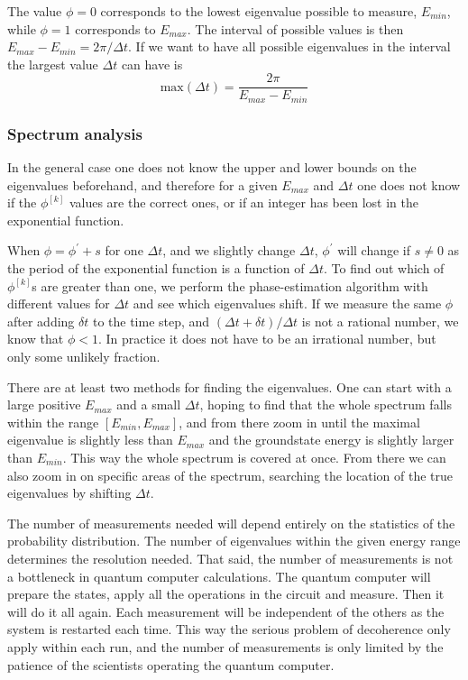 \documentclass[aps,pra,twocolumn,floatfix]{revtex4}
\begin{document}
The value $\phi=0$ corresponds to the lowest eigenvalue possible to measure,
$E_{min}$, while $\phi=1$ corresponds to $E_{max}$. The interval of
possible values is then $E_{max}-E_{min} = 2\pi/\Delta t$. If we want to
have all possible eigenvalues in the interval the largest value
$\Delta t$ can have is 
\begin{equation}
\mathrm{max}(\Delta t) = \frac{2\pi}{E_{max}-E_{min}}
\end{equation}



\subsubsection{Spectrum analysis}

In the general case one does not know the upper and lower bounds on
the eigenvalues beforehand, and therefore for a given $E_{max}$ and
$\Delta t$ one does not know if the $\phi^{[k]}$ values are the correct
ones, or if an integer has been lost in the exponential function.

When $\phi=\phi^\prime +s$ for one
$\Delta t$, and we slightly change $\Delta t$, $\phi^\prime$ will
change if $s\neq 0$ 
as the period of the exponential function is a function of
$\Delta t$. 
To find out which of $\phi^{[k]}$s are greater than
one, we perform the phase-estimation algorithm with different values for $\Delta
t$ and 
see which eigenvalues shift. 
If we measure the same $\phi$ after adding $\delta t$ to
the time step, and $(\Delta t + \delta t)/\Delta t$ is not a rational
number, we know that $\phi <1$. In practice it does not have to be an
irrational number, but only some unlikely fraction.

There are at least two
methods for finding the eigenvalues. One can start with a
large positive $E_{max}$ and a small $\Delta t$, hoping to find that
the whole spectrum falls within the range $[E_{min}, E_{max}]$, and
from there zoom in until the maximal eigenvalue is slightly less than
$E_{max}$ and the groundstate energy is slightly larger than
$E_{min}$. This way the whole spectrum is covered at once.
From there we can also zoom in on specific areas of the spectrum,
searching  the location of the true eigenvalues by shifting $\Delta t$. 

The number of measurements needed will depend entirely on the
statistics of the probability distribution. The number of eigenvalues
within the given energy range determines the resolution needed. 
That said, the number of
measurements is not a bottleneck in quantum computer calculations. The
quantum computer will prepare the states, apply all the operations
in the circuit and measure. Then it will do it all again. Each
measurement will be independent of the others as the system is
restarted each time. This way the serious problem of decoherence only
apply within each run, and the number of measurements is only
limited by the patience of the scientists operating the quantum
computer. 
\end{document}
